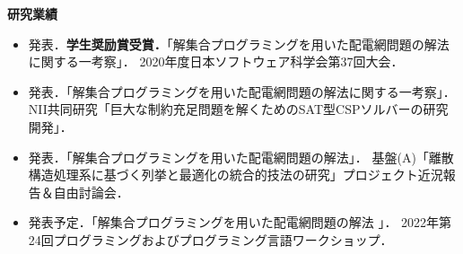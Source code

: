 \documentclass[dvipdfmx,a4paper]{jsarticle}
\begin{document}
\begin{table}[h]
 \centering
 \caption{配電網遷移問題の実行実験(平均CPU時間とその比)}
 \label{table:core}
\end{table}

\textbf{研究業績}
\begin{itemize}
 \small
 \item 発表．\textbf{学生奨励賞受賞．}「解集合プログラミングを用いた配電網問題の解法に関する一考察」．
	   2020年度日本ソフトウェア科学会第37回大会．
 \item 発表．「解集合プログラミングを用いた配電網問題の解法に関する一考察」．
	   NII共同研究「巨大な制約充足問題を解くためのSAT型CSPソルバーの研究開発」．
 \item 発表．「解集合プログラミングを用いた配電網問題の解法」．
	   基盤(A)「離散構造処理系に基づく列挙と最適化の統合的技法の研究」プロジェクト近況報告＆自由討論会．
 \item 発表予定．「解集合プログラミングを用いた配電網問題の解法 」．
      2022年第24回プログラミングおよびプログラミング言語ワークショップ．
\end{itemize}
\end{document}
